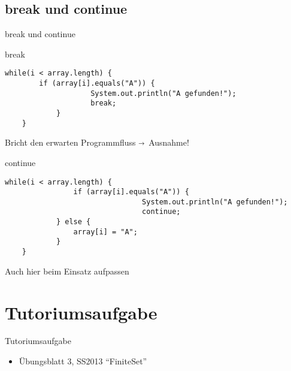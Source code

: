 \documentclass[18pt]{beamer}
\begin{document}
\subsection{break und continue}
\begin{frame}[fragile]{break und continue}
\begin{exampleblock}{break}
\begin{lstlisting}[basicstyle=\scriptsize]
	while(i < array.length) {
	  	if (array[i].equals("A")) {
		    		System.out.println("A gefunden!");
		    		break;
		  	}
	} 
	\end{lstlisting} \pause
\end{exampleblock}
Bricht den erwarten Programmfluss $\shortrightarrow$ Ausnahme!
\begin{exampleblock}{continue}
\begin{lstlisting}[basicstyle=\scriptsize]
	while(i < array.length) {
		   		if (array[i].equals("A")) {
		    					System.out.println("A gefunden!");
		    					continue;
		  	} else {
		    	array[i] = "A";
		  	}
	}
	\end{lstlisting}
\end{exampleblock}
Auch hier beim Einsatz aufpassen
\end{frame}


\section{Tutoriumsaufgabe}
\begin{frame}[fragile]{Tutoriumsaufgabe}
\begin{itemize}
\item Übungsblatt 3, SS2013 "`FiniteSet"'
\end{itemize}
\end{frame}



\appendix
\beginbackup


\backupend
\end{document}
